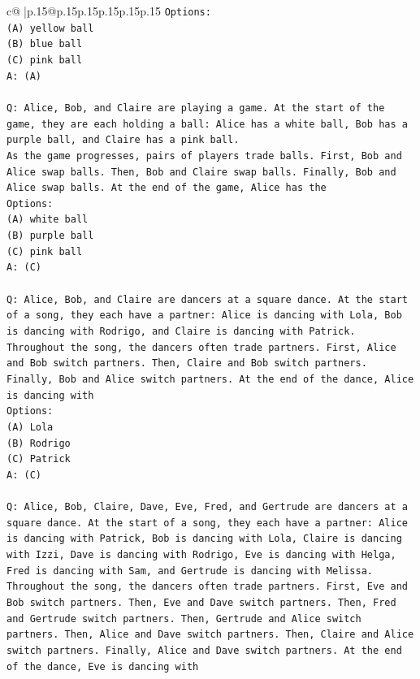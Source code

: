 \documentclass{article}
\begin{document}
{\begin{supertabular}{c@{$\;$}|p{.15\linewidth}@{}p{.15\linewidth}p{.15\linewidth}p{.15\linewidth}p{.15\linewidth}p{.15\linewidth}}
{{{\texttt{Options:} \\
\texttt{(A) yellow ball} \\
\texttt{(B) blue ball} \\
\texttt{(C) pink ball} \\
\texttt{A: (A)} \\
\\ 
\texttt{Q: Alice, Bob, and Claire are playing a game. At the start of the game, they are each holding a ball: Alice has a white ball, Bob has a purple ball, and Claire has a pink ball.} \\
\texttt{As the game progresses, pairs of players trade balls. First, Bob and Alice swap balls. Then, Bob and Claire swap balls. Finally, Bob and Alice swap balls. At the end of the game, Alice has the} \\
\texttt{Options:} \\
\texttt{(A) white ball} \\
\texttt{(B) purple ball} \\
\texttt{(C) pink ball} \\
\texttt{A: (C)} \\
\\ 
\texttt{Q: Alice, Bob, and Claire are dancers at a square dance. At the start of a song, they each have a partner: Alice is dancing with Lola, Bob is dancing with Rodrigo, and Claire is dancing with Patrick.} \\
\texttt{Throughout the song, the dancers often trade partners. First, Alice and Bob switch partners. Then, Claire and Bob switch partners. Finally, Bob and Alice switch partners. At the end of the dance, Alice is dancing with} \\
\texttt{Options:} \\
\texttt{(A) Lola} \\
\texttt{(B) Rodrigo} \\
\texttt{(C) Patrick} \\
\texttt{A: (C)} \\
\\ 
\texttt{Q: Alice, Bob, Claire, Dave, Eve, Fred, and Gertrude are dancers at a square dance. At the start of a song, they each have a partner: Alice is dancing with Patrick, Bob is dancing with Lola, Claire is dancing with Izzi, Dave is dancing with Rodrigo, Eve is dancing with Helga, Fred is dancing with Sam, and Gertrude is dancing with Melissa.} \\
\texttt{Throughout the song, the dancers often trade partners. First, Eve and Bob switch partners. Then, Eve and Dave switch partners. Then, Fred and Gertrude switch partners. Then, Gertrude and Alice switch partners. Then, Alice and Dave switch partners. Then, Claire and Alice switch partners. Finally, Alice and Dave switch partners. At the end of the dance, Eve is dancing with} \\
}}}
\end{supertabular}}
\end{document}
